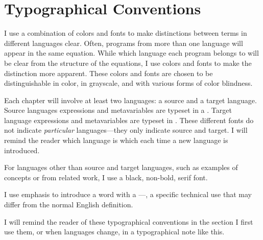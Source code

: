 \chapter*{Typographical Conventions}
I use a combination of colors and fonts to make distinctions between terms in
different languages clear.
Often, programs from more than one language will appear in the same equation.
While which language each program belongs to will be clear from the structure of
the equations, I use colors and fonts to make the distinction more apparent.
These colors and fonts are chosen to be distinguishable in color, in grayscale,
and with various forms of color blindness.

Each chapter will involve at least two languages: a source and a target
language.
Source languages expressions and metavariables are typeset in a .
Target language expressions and metavariables are typeset in .
These different fonts do not indicate \emph{particular} languages---they only
indicate source and target.
I will remind the reader which language is which each time a new language is
introduced.

For languages other than source and target languages, such as examples of
concepts or from related work, I use a {black, non-bold, serif font}.

I use emphasis to introduce a word with a ---\ie,
a specific technical use that may differ from the normal English definition.

\begin{typographical}
I will remind the reader of these typographical conventions in the section I
first use them, or when languages change, in a typographical note like this.
\end{typographical}
